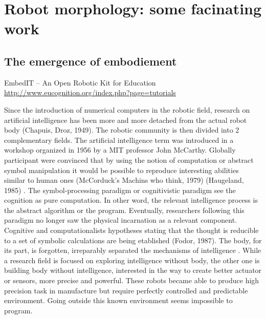 
% 
\chapter{Robot morphology: some facinating work} %




\section{The emergence of embodiement} %

EmbedIT – An Open Robotic Kit for Education
\url{http://www.eucognition.org/index.php?page=tutorials}

Since the introduction of numerical computers in the robotic field, research on artificial intelligence has been more and more detached from the actual robot body (Chapuis, Droz, 1949).
The robotic community is then divided into 2 complementary fields.
The artificial intelligence term was introduced in a workshop organized in 1956 by a MIT professor John McCarthy. Globally participant were convinced that by using the notion of computation or abstract symbol manipulation it would be possible to reproduce interesting abilities similar to human ones (McCorduck's Machins who think, 1979) (Haugeland, 1985) . The symbol-processing paradigm or cognitivistic paradigm see the cognition as pure computation. In other word, the relevant intelligence process is the abstract algorithm or the program. Eventually, researchers following this paradigm no longer saw the physical incarnation as a relevant component.
Cognitive and computationalists hypotheses stating that the thought is reducible to a set of symbolic calculations are being etablished (Fodor, 1987). The body, for its part, is forgotten, irreparably separated the mechanisms of intelligence \cite{kaplan2008corps}.
While a research field is focused on exploring intelligence without body, the other one is building body without intelligence, interested in the way to create better actuator or sensors, more precise and powerful. These robots became able to produce high precision task in manufacture but require perfectly controlled and predictable environment. Going outside this known environment seems impossible to program.


